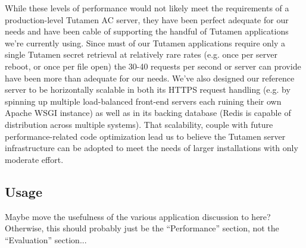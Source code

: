 
While these levels of performance would not likely meet the
requirements of a production-level Tutamen AC server, they have been
perfect adequate for our needs and have been cable of supporting the
handful of Tutamen applications we're currently using. Since must of
our Tutamen applications require only a single Tutamen secret
retrieval at relatively rare rates (e.g. once per server reboot, or
once per file open) the 30-40 requests per second or server can
provide have been more than adequate for our needs. We've also
designed our reference server to be horizontally scalable in both its
HTTPS request handling (e.g. by spinning up multiple load-balanced
front-end servers each ruining their own Apache WSGI instance) as well
as in its backing database (Redis is capable of distribution across
multiple systems). That scalability, couple with future
performance-related code optimization lead us to believe the Tutamen
server infrastructure can be adopted to meet the needs of larger
installations with only moderate effort.

\subsection{Usage}

Maybe move the usefulness of the various application discussion to
here? Otherwise, this should probably just be the ``Performance''
section, not the ``Evaluation'' section...

